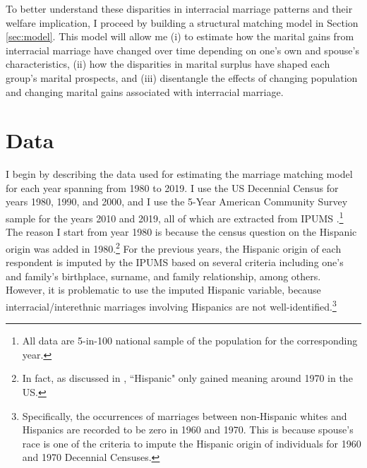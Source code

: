 To better understand these disparities in interracial marriage patterns and their welfare implication, I proceed by building a structural matching model in Section \ref{sec:model}.  This model will allow me (i) to estimate how the marital gains from interracial marriage have changed over time depending on one's own and spouse's characteristics, (ii) how the disparities in marital surplus have shaped each group's marital prospects, and (iii) disentangle the effects of changing population and changing marital gains associated with interracial marriage. 




\section{Data} \label{sec:data}


I begin by describing the data used for estimating the marriage matching model for each year spanning from 1980 to 2019. I use the US Decennial Census for years 1980, 1990, and 2000, and I use the 5-Year American Community Survey sample for the years 2010 and 2019, all of which are extracted from IPUMS \citep{IPUMS_Census}.\footnote{All data are 5-in-100 national sample of the population for the corresponding year.} The reason I start from year 1980 is because the census question on the Hispanic origin was added in 1980.\footnote{In fact, as discussed in \cite{oflaherty_book_2015}, ``Hispanic" only gained meaning around 1970 in the US.} For the previous years, the Hispanic origin of each respondent is imputed by the IPUMS based on several criteria including one's and family's birthplace, surname, and family relationship, among others. However, it is problematic to use the imputed Hispanic variable, because interracial/interethnic marriages involving Hispanics are not well-identified.\footnote{ Specifically, the occurrences of marriages between non-Hispanic whites and Hispanics are recorded to be zero in 1960 and 1970. This is because spouse's race is one of the criteria to impute the Hispanic origin of individuals for 1960 and 1970 Decennial Censuses.} 

